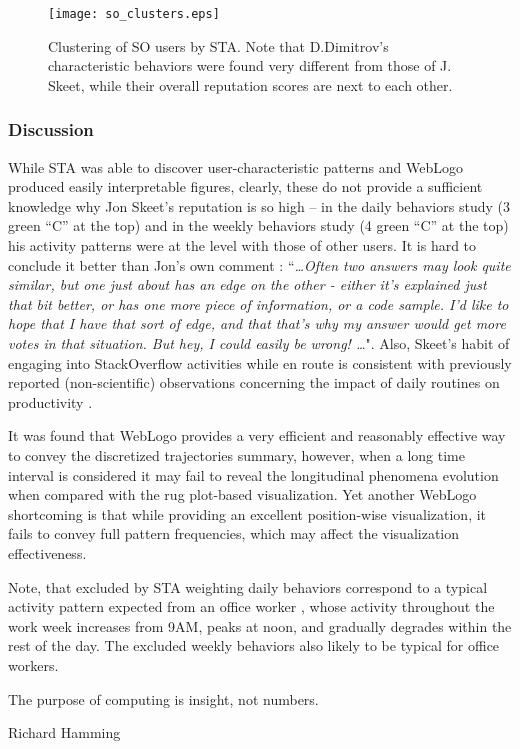 \begin{figure}[t]
   \centering
   \texttt{[image: so\_clusters.eps]}
   \caption{Clustering of SO users by STA. Note that D.Dimitrov's characteristic behaviors were found very different from those of J. Skeet, while their overall reputation scores are next to each other.}
   \label{fig:stack_clusters}   
\end{figure}

\subsubsection{Discussion}
While STA was able to discover user-characteristic patterns and WebLogo produced easily interpretable figures, clearly, these do not provide a sufficient knowledge why Jon Skeet's reputation is so high -- in the daily behaviors study (3 green ``C'' at the top) and in the weekly behaviors study (4 green ``C'' at the top) his activity patterns were at the level with those of other users. It is hard to conclude it better than Jon's own comment \cite{skeet}: ``\textit{\dots Often two answers may look quite similar, but one just about has an edge on the other - either it's explained just that bit better, or has one more piece of information, or a code sample. I'd like to hope that I have that sort of edge, and that that's why my answer would get more votes in that situation. But hey, I could easily be wrong! \dots}". Also, Skeet's habit of engaging into StackOverflow activities while en route is consistent with previously reported (non-scientific) observations concerning the impact of daily routines on productivity \cite{tharp_habit}.

It was found that WebLogo provides a very efficient and reasonably effective way to convey the discretized trajectories summary, however, when a long time interval is considered it may fail to reveal the longitudinal phenomena evolution when compared with the rug plot-based visualization. Yet another WebLogo shortcoming is that while providing an excellent position-wise visualization, it fails to convey full pattern frequencies, which may affect the visualization effectiveness.

Note, that excluded by STA weighting daily behaviors correspond to a typical activity pattern expected from an office worker \cite{activity_patterns}, whose activity throughout the work week increases from 9AM, peaks at noon, and gradually degrades within the rest of the day. The excluded weekly behaviors also likely to be typical for office workers.


\epigraph{The purpose of computing is insight, not numbers.}{Richard Hamming}
